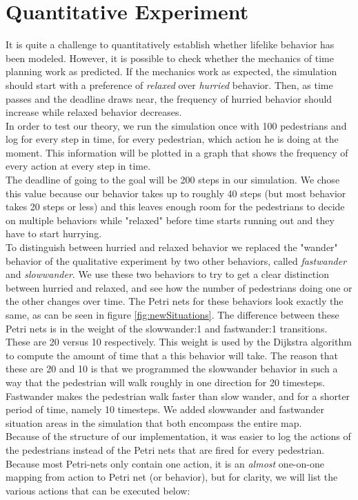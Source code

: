 \documentclass[11pt, a4paper]{book}
\begin{document}
\section{Quantitative Experiment}
It is quite a challenge to quantitatively establish whether lifelike behavior has been modeled. However, it is possible to check whether the mechanics of time planning work as predicted. If the mechanics work as expected, the simulation should start with a preference of \emph{relaxed} over \emph{hurried} behavior. Then, as time passes and the deadline draws near, the frequency of hurried behavior should increase while relaxed behavior decreases.\\
In order to test our theory, we run the simulation once with 100 pedestrians and log for every step in time, for every pedestrian, which action he is doing at the moment. This information will be plotted in a graph that shows the frequency of every action at every step in time.\\
The deadline of going to the goal will be 200 steps in our simulation. We chose this value because our behavior takes up to roughly 40 steps (but most behavior takes 20 steps or less) and this leaves enough room for the pedestrians to decide on multiple behaviors while "relaxed" before time starts running out and they have to start hurrying.\\
To distinguish between hurried and relaxed behavior we replaced the "wander" behavior of the qualitative experiment by two other behaviors, called \emph{fastwander} and \emph{slowwander}. We use these two behaviors to try to get a clear distinction between hurried and relaxed, and see how the number of pedestrians doing one or the other changes over time. The Petri nets for these behaviors look exactly the same, as can be seen in figure \ref{fig:newSituations}. The difference between these Petri nets is in the weight of the slowwander:1 and fastwander:1 transitions. These are 20 versus 10 respectively. This weight is used by the Dijkstra algorithm to compute the amount of time that a this behavior will take. The reason that these are 20 and 10 is that we programmed the slowwander behavior in such a way that the pedestrian will walk roughly in one direction for 20 timesteps. Fastwander makes the pedestrian walk faster than slow wander, and for a shorter period of time, namely 10 timesteps. We added slowwander and fastwander situation areas in the simulation that both encompass the entire map.\\
Because of the structure of our implementation, it was easier to log the actions of the pedestrians instead of the Petri nets that are fired for every pedestrian. Because most Petri-nets only contain one action, it is an \emph{almost} one-on-one mapping from action to  Petri net (or behavior), but for clarity, we will list the various actions that can be executed below:\\
\end{document}
